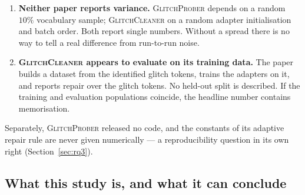 \documentclass[11pt,a4paper]{article}
\newcommand{\gp}{\textsc{GlitchProber}}
\newcommand{\gc}{\textsc{GlitchCleaner}}
\begin{document}
\begin{enumerate}[leftmargin=*]
The two boldface disagreements are small but they are not noise, and they are the
part of this table that is hardest to explain any other way. If \gc{} had quoted
\gp{}'s rates, its rates would equal \gp{}'s in all five rows. They do not: the
rows where the rescaled count required rounding are exactly the rows where the
rate moved, and it moved to whatever the \emph{rounded count} divided by \gc{}'s
own $|G|$ gives ($956/2539 = 37.65\%$; $3188/5985 = 53.27\%$). The reported average
for the \gp{} column follows the same pattern: $50.08\%$, the mean of the five
recomputed rates, against \gp{}'s own published average of $50.06\%$.

To be fair to the authors: the rate is carried over faithfully, and rescaling is a
defensible way to place two rates on a common axis. Two things are nevertheless
wrong with it as presented. The counts are labelled as taken from the original
paper when they are computed; and the computation silently assumes that \gp{}'s
rate transfers to a \emph{different set} of tokens. Section~\ref{sec:rq1} shows
these are not merely different-sized populations but different token sets, so the
assumption is substantive and untested. This is exactly the failure that fixing
the denominator prevents.

\item \textbf{Neither paper reports variance.} \gp{} depends on a random $10\%$
vocabulary sample; \gc{} on a random adapter initialisation and batch order. Both
report single numbers. Without a spread there is no way to tell a real difference
from run-to-run noise.

\item \textbf{\gc{} appears to evaluate on its training data.} The paper builds a
dataset from the identified glitch tokens, trains the adapters on it, and reports
repair over the glitch tokens. No held-out split is described. If the training and
evaluation populations coincide, the headline number contains memorisation.
\end{enumerate}

Separately, \gp{} released no code, and the constants of its adaptive repair rule
are never given numerically --- a reproducibility question in its own right
(Section~\ref{sec:rq3}).

\subsection{What this study is, and what it can conclude}
\label{sec:epistemics}
\end{document}

